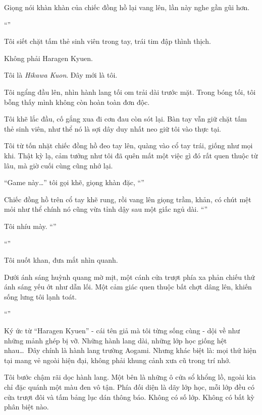 \documentclass[../main.tex]{subfiles}
\begin{document}
Giọng nói khàn khàn của chiếc đồng hồ lại vang lên, lần này nghe gần gũi hơn.

``''

Tôi siết chặt tấm thẻ sinh viên trong tay, trái tim đập thình thịch.

Không phải Haragen Kyuen.

Tôi là \emph{Hikawa Kuon}. Đây mới là tôi.

Tôi ngẩng đầu lên, nhìn hành lang tối om trải dài trước mặt. Trong bóng tối, tôi bỗng thấy mình không còn hoàn toàn đơn độc.

Tôi khẽ lắc đầu, cố gắng xua đi cơn đau còn sót lại. Bàn tay vẫn giữ chặt tấm thẻ sinh viên, như thể nó là sợi dây duy nhất neo giữ tôi vào thực tại.

Tôi từ tốn nhặt chiếc đồng hồ đeo tay lên, quàng vào cổ tay trái, giống như mọi khi. Thật kỳ lạ, cảm tưởng như tôi đã quên mất một việc gì đó rất quen thuộc từ lâu, mà giờ cuối cùng cũng nhớ lại.

``Game này\dots'' tôi gọi khẽ, giọng khàn đặc, ``''

Chiếc đồng hồ trên cổ tay khẽ rung, rồi vang lên giọng trầm, khản, có chút mệt mỏi như thể chính nó cũng vừa tỉnh dậy sau một giấc ngủ dài. ``''

Tôi nhíu mày. ``''

``''

Tôi nuốt khan, đưa mắt nhìn quanh.

Dưới ánh sáng huỳnh quang mờ mịt, một cánh cửa trượt phía xa phản chiếu thứ ánh sáng yếu ớt như dẫn lối. Một cảm giác quen thuộc bất chợt dâng lên, khiến sống lưng tôi lạnh toát.

``''

Ký ức từ ``Haragen Kyuen'' - cái tên giả mà tôi từng sống cùng - dội về như những mảnh ghép bị vỡ. Những hành lang dài, những lớp học giống hệt nhau\dots\ Đây chính là hành lang trường Aogami. Nhưng khác biệt là: mọi thứ hiện tại mang vẻ ngoài hiện đại, không phải khung cảnh xưa cũ trong trí nhớ.

Tôi bước chậm rãi dọc hành lang. Một bên là những ô cửa sổ khổng lồ, ngoài kia chỉ đặc quánh một màu đen vô tận. Phía đối diện là dãy lớp học, mỗi lớp đều có cửa trượt đôi và tấm bảng lục dán thông báo. Không có số lớp. Không có bất kỳ phân biệt nào.
\end{document}
